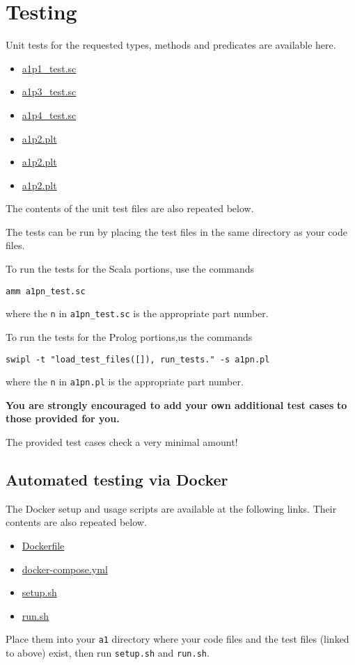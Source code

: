 \documentclass[11pt]{article}
\begin{document}
\section*{Testing}
\label{sec:org29c3501}
Unit tests for the requested types, methods and predicates
are available here.
\begin{itemize}
\item \href{./testing/a1/a1p1\_test.sc}{a1p1\_test.sc}
\item \href{./testing/a1/a1p3\_test.sc}{a1p3\_test.sc}
\item \href{./testing/a1/a1p4\_test.sc}{a1p4\_test.sc}
\item \href{./testing/a1/a1p2.plt}{a1p2.plt}
\item \href{./testing/a1/a1p3.plt}{a1p2.plt}
\item \href{./testing/a1/a1p4.plt}{a1p2.plt}
\end{itemize}
The contents of the unit test files are also repeated below.

The tests can be run by placing the test files
in the same directory as your code files.

To run the tests for the Scala portions, use the commands
\begin{verbatim}
amm a1pn_test.sc
\end{verbatim}
where the \texttt{n} in \texttt{a1pn\_test.sc} is the appropriate part number.

To run the tests for the Prolog portions,us the commands
\begin{verbatim}
swipl -t "load_test_files([]), run_tests." -s a1pn.pl
\end{verbatim}
where the \texttt{n} in \texttt{a1pn.pl} is the appropriate part number.

\begin{center}
\textbf{You are strongly encouraged to add your own additional test cases}
\textbf{to those provided for you.}

The provided test cases check a very minimal amount!
\end{center}

\subsection*{Automated testing via Docker}
\label{sec:org1e2d101}
The Docker setup and usage scripts are available at the following links.
Their contents are also repeated below.
\begin{itemize}
\item \href{./testing/a1/Dockerfile}{Dockerfile}
\item \href{./testing/a1/docker-compose.yml}{docker-compose.yml}
\item \href{./testing/a1/setup.sh}{setup.sh}
\item \href{./testing/a1/run.sh}{run.sh}
\end{itemize}
Place them into your \texttt{a1} directory where your code files
and the test files (linked to above) exist,
then run \texttt{setup.sh} and \texttt{run.sh}.
\end{document}
